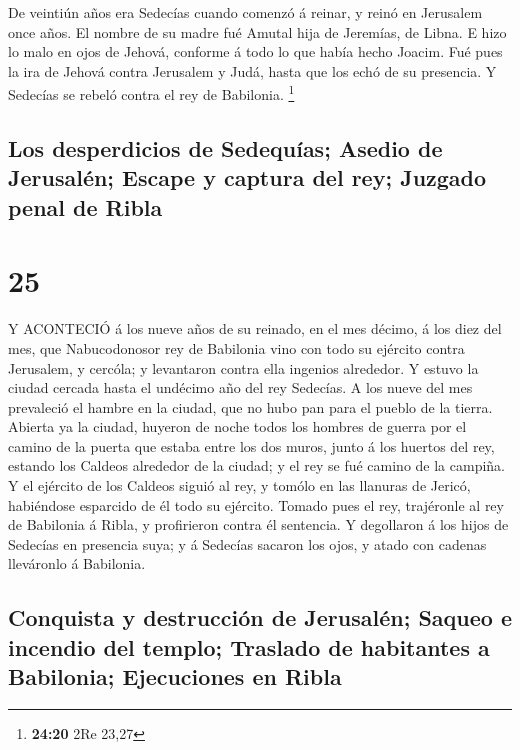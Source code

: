  De veintiún años era Sedecías cuando comenzó á reinar, y
reinó en Jerusalem once años. El nombre de su madre fué Amutal hija de
Jeremías, de Libna.  E hizo lo malo en ojos de Jehová,
conforme á todo lo que había hecho Joacim.  Fué pues la ira
de Jehová contra Jerusalem y Judá, hasta que los echó de su presencia. Y
Sedecías se rebeló contra el rey de Babilonia. \footnote{\textbf{24:20}
  2Re 23,27}

\hypertarget{los-desperdicios-de-sedequuxedas-asedio-de-jerusaluxe9n-escape-y-captura-del-rey-juzgado-penal-de-ribla}{%
\subsection{Los desperdicios de Sedequías; Asedio de Jerusalén; Escape y
captura del rey; Juzgado penal de
Ribla}\label{los-desperdicios-de-sedequuxedas-asedio-de-jerusaluxe9n-escape-y-captura-del-rey-juzgado-penal-de-ribla}}

\hypertarget{section-24}{%
\section{25}\label{section-24}}

 Y ACONTECIÓ á los nueve años de su reinado, en el mes
décimo, á los diez del mes, que Nabucodonosor rey de Babilonia vino con
todo su ejército contra Jerusalem, y cercóla; y levantaron contra ella
ingenios alrededor.  Y estuvo la ciudad cercada hasta el
undécimo año del rey Sedecías.  A los nueve del mes
prevaleció el hambre en la ciudad, que no hubo pan para el pueblo de la
tierra.  Abierta ya la ciudad, huyeron de noche todos los
hombres de guerra por el camino de la puerta que estaba entre los dos
muros, junto á los huertos del rey, estando los Caldeos alrededor de la
ciudad; y el rey se fué camino de la campiña.  Y el ejército
de los Caldeos siguió al rey, y tomólo en las llanuras de Jericó,
habiéndose esparcido de él todo su ejército.  Tomado pues el
rey, trajéronle al rey de Babilonia á Ribla, y profirieron contra él
sentencia.  Y degollaron á los hijos de Sedecías en
presencia suya; y á Sedecías sacaron los ojos, y atado con cadenas
lleváronlo á Babilonia.

\hypertarget{conquista-y-destrucciuxf3n-de-jerusaluxe9n-saqueo-e-incendio-del-templo-traslado-de-habitantes-a-babilonia-ejecuciones-en-ribla}{%
\subsection{Conquista y destrucción de Jerusalén; Saqueo e incendio del
templo; Traslado de habitantes a Babilonia; Ejecuciones en
Ribla}\label{conquista-y-destrucciuxf3n-de-jerusaluxe9n-saqueo-e-incendio-del-templo-traslado-de-habitantes-a-babilonia-ejecuciones-en-ribla}}


